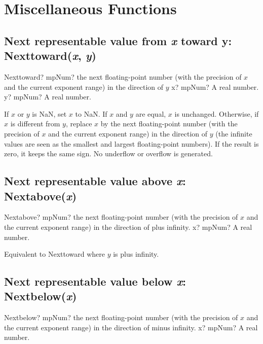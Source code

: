 \section{Miscellaneous Functions}

\subsection{Next representable value from \textit{x} toward y: Nexttoward(\textit{x}, \textit{y})}

\begin{mpFunctionsExtract}
	\mpFunctionTwo
	{Nexttoward? mpNum? the next floating-point number (with the precision of $x$ and the current exponent range) in the direction of $y$}
	{x? mpNum? A real number.}
	{y? mpNum? A real number.}
\end{mpFunctionsExtract}


\vspace{0.3cm}
If $x$ or $y$ is NaN, set $x$ to NaN. If $x$ and $y$ are equal, $x$ is unchanged. Otherwise, if $x$ is different from $y$, replace $x$ by the next floating-point number (with the precision of $x$ and the current exponent range) in the direction of $y$ (the infinite values are seen as the smallest and largest floating-point numbers). If the result is zero, it keeps the same sign. No underflow or overflow is generated.




\subsection{Next representable value above \textit{x}: Nextabove(\textit{x})}

\begin{mpFunctionsExtract}
	\mpFunctionOne
	{Nextabove? mpNum? the next floating-point number (with the precision of $x$ and the current exponent range) in the direction of plus infinity.}
	{x? mpNum? A real number.}
\end{mpFunctionsExtract}

\vspace{0.3cm}
Equivalent to Nexttoward where $y$ is plus infinity.




\subsection{Next representable value below \textit{x}: Nextbelow(\textit{x})}

\begin{mpFunctionsExtract}
	\mpFunctionOne
	{Nextbelow? mpNum? the next floating-point number (with the precision of $x$ and the current exponent range) in the direction of minus infinity.}
	{x? mpNum? A real number.}
\end{mpFunctionsExtract}


